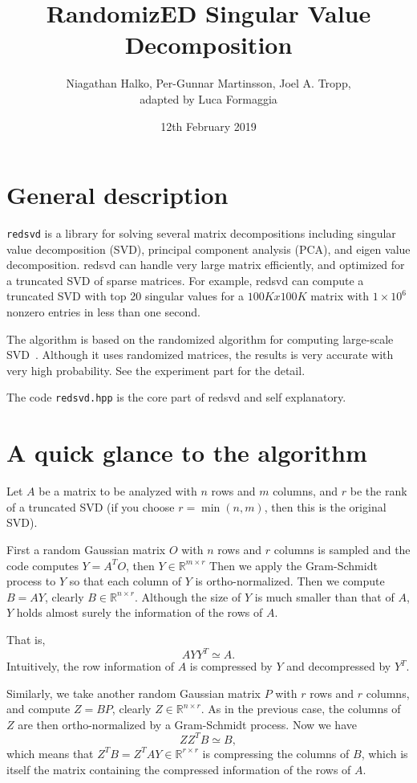 \documentclass{article}
\title{RandomizED Singular Value Decomposition}
\author{Niagathan Halko, Per-Gunnar Martinsson, Joel A. Tropp,\\ adapted
  by Luca Formaggia}
\date{12th February 2019}
\begin{document}
\maketitle
\section{General description}
\texttt{redsvd} is a library for solving several matrix decompositions
including singular value decomposition (SVD), principal component
analysis (PCA), and eigen value decomposition. redsvd can handle very
large matrix efficiently, and optimized for a truncated SVD of sparse
matrices. For example, redsvd can compute a truncated SVD with top 20
singular values for a $100K x 100K$ matrix with $1\times 10^6$ nonzero entries in
less than one second.

The algorithm is based on the randomized algorithm for computing
large-scale SVD~\cite{Haiko11}. Although it uses randomized matrices,
the results is very accurate with very high probability. See the
experiment part for the detail.

The code \texttt{redsvd.hpp} is the core part of redsvd and self explanatory.

\section{A quick glance to the algorithm}
Let $A$ be a matrix to be analyzed with $n$ rows and $m$ columns, and $r$ be
the rank of a truncated SVD (if you choose $r = \min(n, m)$, then this
is the original SVD).

First a random Gaussian matrix $O$ with $n$ rows and $r$ columns is sampled
and the code computes $Y = A^T O$, then $Y\in\mathbb{R}^{m\times r}$
Then we apply the Gram-Schmidt
process to $Y$ so that each column of $Y$ is ortho-normalized. Then we
compute $B = AY$, clearly $B\in\mathbb{R}^{n\times r}$. Although the size of $Y$ is
much smaller than that of $A$, $Y$ holds almost surely the information of the rows of $A$.

That is,
\[
  AYY^T\simeq A.
\]
Intuitively, the row information of $A$ is compressed by $Y$ and
decompressed by $Y^T$.

Similarly, we take another random Gaussian matrix $P$ with $r$ rows
and $r$ columns, and compute $Z = BP$, clearly $Z\in\mathbb{R}^{n\times r}$. As in the previous case, the
columns of $Z$ are then ortho-normalized by a Gram-Schmidt process. Now
we have
\[
ZZ^T B \simeq B,
\]
which means that $Z^TB=Z^{T}AY\in\mathbb{R}^{r\times r}$ is compressing the columns of $B$, which is itself the matrix containing the
compressed information of the rows of $A$.
\end{document}
